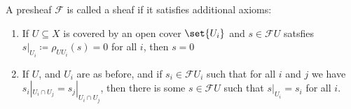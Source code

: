 A presheaf $\mathcal{F}$ is called a sheaf if it satisfies additional axioms:
\begin{enumerate}[label=(S\arabic*)]
	\item If  $U \subseteq X$ is covered by an open cover $\set{U_i}$ and $s \in \mathcal{F}U$ satsfies
		$s|_{U_i}\coloneqq\rho_{UU_i}(s) = 0$ for all $i$, then $s = 0$
	\item If $U$, and $U_i$ are as before, and if $s_i \in \mathcal{F}U_i$ such that
		for all $i$ and $j$ we have $s_i|_{U_i\cap U_j} = s_j|_{U_i \cap U_j}$, then
		there is some $s \in \mathcal{F}U$ such that $s|_{U_i} = s_i$ for all $i$.
\end{enumerate}
